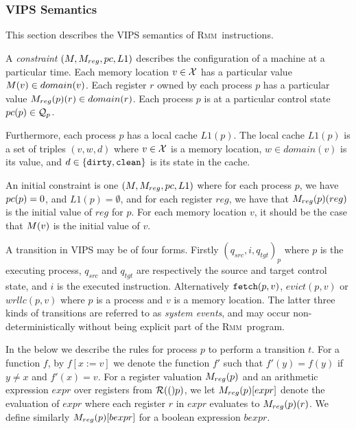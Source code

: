 \documentclass[a4paper]{article}
\newcommand{\rmm}{\textsc{Rmm}}
\begin{document}
\subsubsection{VIPS Semantics}\label{sec:rmm:vips}

\newcommand{\lone}{L1}
\newcommand{\dirty}{{\tt dirty}}
\newcommand{\clean}{{\tt clean}}
\newcommand{\fetch}{{\tt fetch}}
\newcommand{\evict}{{\tt evict}}
\newcommand{\wrllc}{{\tt wrllc}}
\newcommand{\fence}{{\tt fence}}
\newcommand{\syncrwrite}{{\tt syncwr}}
\newcommand{\inlone}[2]{#2{\tt .has}(#1)}
\newcommand{\notinlone}[2]{\neg #2{\tt .has}(#1)}
\newcommand{\lonerem}[2]{#1 \obslash #2}
\newcommand{\lonevalof}[2]{#1(#2){.\tt val}}
\newcommand{\lonemodof}[2]{#1(#2){.\tt mod}}
\newcommand{\theunique}{The\hspace{2pt}}


This section describes the VIPS semantics of \rmm\ instructions.

A {\em constraint} $(\mem,\regval,\pc,\lone)$ describes the
configuration of a machine at a particular time. Each memory location
$v\in\mathcal{X}$ has a particular value $M(v)\in domain(v)$. Each
register $r$ owned by each process $p$ has a particular value
$M_{reg}(p)(r)\in domain(r)$. Each process $p$ is at a particular
control state $pc(p)\in\mathcal{Q}_{p}$.

Furthermore, each process $p$ has a local cache $\lone(p)$. The local
cache $\lone(p)$ is a set of triples $(v,w,d)$ where $v\in\mathcal{X}$ is a
memory location, $w\in domain(v)$ is its value, and
$d\in\{\dirty,\clean\}$ is its state in the cache.

An initial constraint is one $(\mem,\regval,\pc,\lone)$ where for each
process $p$, we have $pc(p) = 0$, and $\lone(p) = \emptyset$, and for
each register $reg$, we have that $M_{reg}(p)(reg)$ is the initial
value of $reg$ for $p$. For each memory location $v$, it should be the
case that $M(v)$ is the initial value of $v$.

A transition in VIPS may be of four forms. Firstly
$(q_{src},i,q_{tgt})_p$ where $p$ is the executing process, $q_{src}$
and $q_{tgt}$ are respectively the source and target control state,
and $i$ is the executed instruction. Alternatively $\fetch(p,v)$,
$evict(p,v)$ or $wrllc(p,v)$ where $p$ is a process and $v$ is a
memory location. The latter three kinds of transitions are referred to
as {\em system events}, and may occur non-deterministically without
being explicit part of the \rmm\ program.

In the below we describe the rules for process $p$ to perform a
transition $t$. For a function $f$, by $f[x:=v]$ we denote the
function $f'$ such that $f'(y) = f(y)$ if $y \neq x$ and $f'(x) =
v$. For a register valuation $M_{reg}(p)$ and an arithmetic expression
$expr$ over registers from $\mathcal{R}(()p)$, we let $M_{reg}(p)[expr]$
denote the evaluation of $expr$ where each register $r$ in $expr$
evaluates to $M_{reg}(p)(r)$. We define similarly $M_{reg}(p)[bexpr]$
for a boolean expression $bexpr$.
\end{document}
